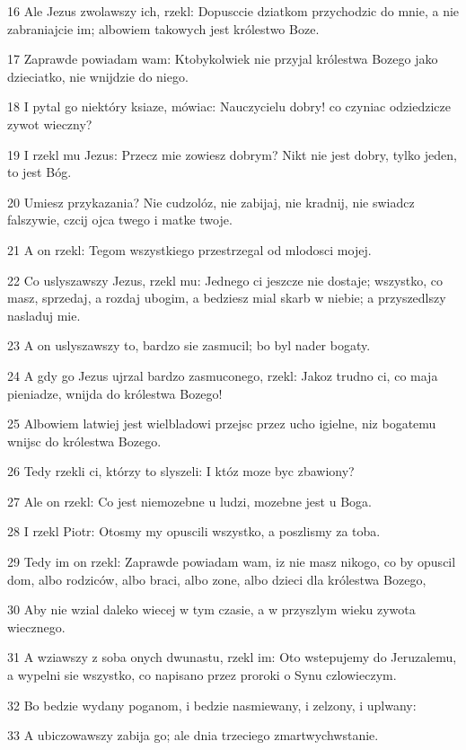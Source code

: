 \par 16 Ale Jezus zwolawszy ich, rzekl: Dopusccie dziatkom przychodzic do mnie, a nie zabraniajcie im; albowiem takowych jest królestwo Boze.
\par 17 Zaprawde powiadam wam: Ktobykolwiek nie przyjal królestwa Bozego jako dzieciatko, nie wnijdzie do niego.
\par 18 I pytal go niektóry ksiaze, mówiac: Nauczycielu dobry! co czyniac odziedzicze zywot wieczny?
\par 19 I rzekl mu Jezus: Przecz mie zowiesz dobrym? Nikt nie jest dobry, tylko jeden, to jest Bóg.
\par 20 Umiesz przykazania? Nie cudzolóz, nie zabijaj, nie kradnij, nie swiadcz falszywie, czcij ojca twego i matke twoje.
\par 21 A on rzekl: Tegom wszystkiego przestrzegal od mlodosci mojej.
\par 22 Co uslyszawszy Jezus, rzekl mu: Jednego ci jeszcze nie dostaje; wszystko, co masz, sprzedaj, a rozdaj ubogim, a bedziesz mial skarb w niebie; a przyszedlszy nasladuj mie.
\par 23 A on uslyszawszy to, bardzo sie zasmucil; bo byl nader bogaty.
\par 24 A gdy go Jezus ujrzal bardzo zasmuconego, rzekl: Jakoz trudno ci, co maja pieniadze, wnijda do królestwa Bozego!
\par 25 Albowiem latwiej jest wielbladowi przejsc przez ucho igielne, niz bogatemu wnijsc do królestwa Bozego.
\par 26 Tedy rzekli ci, którzy to slyszeli: I któz moze byc zbawiony?
\par 27 Ale on rzekl: Co jest niemozebne u ludzi, mozebne jest u Boga.
\par 28 I rzekl Piotr: Otosmy my opuscili wszystko, a poszlismy za toba.
\par 29 Tedy im on rzekl: Zaprawde powiadam wam, iz nie masz nikogo, co by opuscil dom, albo rodziców, albo braci, albo zone, albo dzieci dla królestwa Bozego,
\par 30 Aby nie wzial daleko wiecej w tym czasie, a w przyszlym wieku zywota wiecznego.
\par 31 A wziawszy z soba onych dwunastu, rzekl im: Oto wstepujemy do Jeruzalemu, a wypelni sie wszystko, co napisano przez proroki o Synu czlowieczym.
\par 32 Bo bedzie wydany poganom, i bedzie nasmiewany, i zelzony, i uplwany:
\par 33 A ubiczowawszy zabija go; ale dnia trzeciego zmartwychwstanie.
